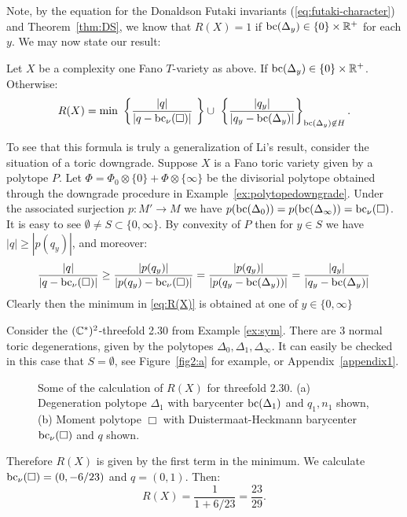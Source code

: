 Note, by the equation for the Donaldson Futaki invariants (\ref{eq:futaki-character}) and Theorem~\ref{thm:DS}, we know that \(R(X) = 1\) if \(\mathop{\rm bc}\nolimits(\Delta_y) \in \{0\} \times \mathbb{R}^+\) for each \(y\). We may now state our result:

\begin{theorem} \label{thm:R(X)} Let \(X\) be a complexity one Fano \(T\)-variety as above. If \(\mathop{\rm bc}\nolimits(\Delta_y) \in \{0\} \times \mathbb{R}^+\). Otherwise:
\begin{equation} \label{eq:R(X)}
R(X) = \min \  \left\lbrace \frac{|q|}{|q-\bc_\nu(\Box)|}  \ \right\rbrace \cup \ \left\lbrace \frac{|q_y|}{|q_y - \bc(\Delta_y)|} \right\rbrace_{\bc(\Delta_y) \not\in H} .
\end{equation}
\end{theorem}
\begin{example}
To see that this formula is truly a generalization of Li's result, consider the situation of a toric downgrade. Suppose \(X\) is a Fano toric variety given by a polytope \(P\). Let \(\Phi = \Phi_0 \otimes \{0\} + \Phi \otimes \{\infty\}\) be the divisorial polytope obtained through the downgrade procedure in Example~\ref{ex:polytopedowngrade}. Under the associated surjection \(p: M' \to M\) we have \(p(\mathop{\rm bc}\nolimits(\Delta_0)) = p(\mathop{\rm bc}\nolimits(\Delta_\infty)) = \mathop{\rm bc}\nolimits_\nu(\Box)\). It is easy to see \(\emptyset \neq S \subset \{0,\infty\}\). By convexity of \(P\) then for \(y \in S\) we have \(|q| \ge |p(q_y)|\), and moreover:
\[
\frac{|q|}{|q-\mathop{\rm bc}\nolimits_\nu(\Box)|} \ge \frac{|p(q_y)|}{|p(q_y)-\mathop{\rm bc}\nolimits_\nu(\Box)|} = \frac{|p(q_y)|}{|p(q_y-\mathop{\rm bc}\nolimits(\Delta_y))|} = \frac{|q_y|}{|q_y-\mathop{\rm bc}\nolimits(\Delta_y)|}
\]
Clearly then the minimum in \normalfont{(}\ref{eq:R(X)}\normalfont{)} is obtained at one of \(y \in \{0,\infty\}\)
\end{example}
\begin{example}
Consider the \((\mathbb{C}^*)^2\)-threefold 2.30 from Example \ref{ex:sym}. There are \(3\) normal toric degenerations, given by the polytopes \(\Delta_{0},\Delta_1,\Delta_{\infty}\). It can easily be checked in this case that \(S = \emptyset\), see Figure~\ref{fig2:a} for example, or Appendix~\ref{appendix1}.
\begin{figure}[h]
	\subcaptionbox{\label{fig2:a}}{\degendiagram}\hfill%
	\subcaptionbox{\label{fig2:b}}{\momentdiagram}%
	\caption{Some of the calculation of $R(X)$ for threefold 2.30. (a) Degeneration polytope $\Delta_1$ with barycenter $\mathop{\rm bc}\nolimits(\Delta_1)$ and $q_1,n_1$ shown, (b) Moment polytope $\Box$ with Duistermaat-Heckmann barycenter $\mathop{\rm bc}\nolimits_\nu(\Box)$ and $q$ shown.}
\end{figure}
Therefore \(R(X)\) is given by the first term in the minimum. We calculate \(\mathop{\rm bc}\nolimits_\nu(\Box)= (0,-6/23)\) and \(q = (0,1)\). Then:
\[
R(X) = \frac{1}{1+ 6/23} = \frac{23}{29}.
\]
\end{example}

